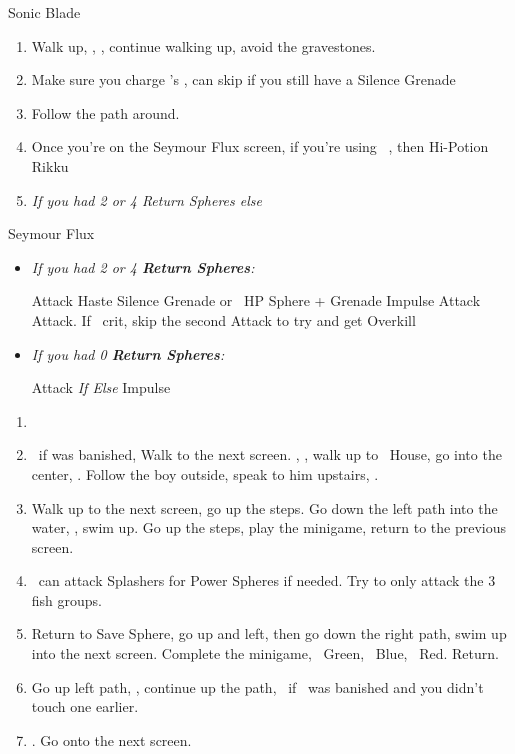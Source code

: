 \begin{equip}
	\begin{itemize}
		\auronf Sonic Blade
	\end{itemize}
\end{equip}
\begin{enumerate}[resume]
	\item Walk up, \sd, \cs[1:20], continue walking up, avoid the gravestones.
	\item Make sure you charge \rikku's \od, can skip if you still have a Silence Grenade
	\item Follow the path around.
	\item Once you're on the Seymour Flux screen, if you're using \rikku\ \od, then Hi-Potion Rikku
	\item \formation{\tidus}{\yuna}{\auron} \textit{If you had 2 or 4 Return Spheres else } \formation{\tidus}{\kimahri}{\wakka}
\end{enumerate}
\begin{battle}[70000]{Seymour Flux}
	\begin{itemize}
		\item \textit{If you had 2 or 4 \textbf{Return Spheres}:}
		      \begin{itemize}
			      \yunaf Attack
			      \tidusf Haste \yuna
			      \switch{\auron}{\rikku}
			      \rikkuf Silence Grenade or \od\ HP Sphere + Grenade
			      \summon{\bahamut}
			      \bahamutf Impulse
			      \yunaf Attack
			      \tidusf Attack. If \yuna\ crit, skip the second Attack to try and get Overkill
		      \end{itemize}
		\item \textit{If you had 0 \textbf{Return Spheres}:}
		      \begin{itemize}
			      \switch{\tidus}{\yuna}
			      \summon{\bahamut}
			      \bahamutf Attack \textit{If \blitzwin Else} Impulse
		      \end{itemize}
	\end{itemize}
\end{battle}
\begin{enumerate}[resume]
	\item \formation{\tidus}{\kimahri}{\auron}
	\item \save\ if \bahamut was banished, Walk to the next screen. \skippablefmv[0:20], \sd, walk up to \tidus\ House, go into the center, \sd. Follow the boy outside, speak to him upstairs, \sd.
	\item Walk up to the next screen, go up the steps. Go down the left path into the water, \sd, swim up. Go up the steps, play the minigame, return to the previous screen.
	\item \tidus\ can attack Splashers for Power Spheres if needed. Try to only attack the 3 fish groups.
	\item Return to Save Sphere, go up and left, then go down the right path, swim up into the next screen. Complete the minigame, \rikku\ Green, \tidus\ Blue, \wakka\ Red. Return.
	\item Go up left path, \sd, continue up the path, \save\ if \bahamut\ was banished and you didn't touch one earlier.
	\item \formation{\tidus}{\yuna}{\kimahri}. Go onto the next screen.
\end{enumerate}
